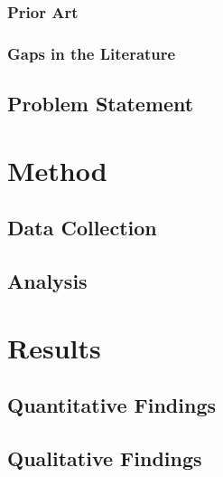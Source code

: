 \documentclass{miun}
\begin{document}
\lipsum[6]

\subsubsection{Prior Art}

\lipsum[7]

\subsubsection{Gaps in the Literature}

\lipsum[8]

\subsection{Problem Statement}

\lipsum[9]

\section{Method}

\lipsum[10-11]

\subsection{Data Collection}

\lipsum[12]

\subsection{Analysis}

\lipsum[13]

\section{Results}

\lipsum[14-15]

\subsection{Quantitative Findings}

\lipsum[16]

\subsection{Qualitative Findings}
\end{document}
